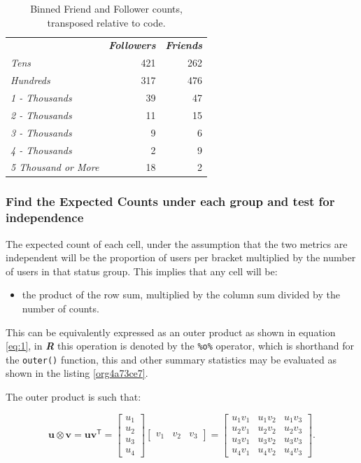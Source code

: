 \documentclass[11pt]{article}
\begin{document}
\begin{table}[htbp]
\caption{\label{tab:orgd6ff7eb}Binned Friend and Follower counts, transposed relative to code.}
\centering
\begin{tabular}{lrr}
 & \textbf{\textbf{\emph{Followers}}} & \textbf{\textbf{\emph{Friends}}}\\
\emph{Tens} & 421 & 262\\
\emph{Hundreds} & 317 & 476\\
\emph{1 - Thousands} & 39 & 47\\
\emph{2 - Thousands} & 11 & 15\\
\emph{3 - Thousands} & 9 & 6\\
\emph{4 - Thousands} & 2 & 9\\
\emph{5 Thousand or More} & 18 & 2\\
\end{tabular}
\end{table}

\subsubsection{Find the Expected Counts under each group and test for independence}
\label{sec:org65bb277}
The expected count of each cell, under the assumption that the two metrics are
independent will be the proportion of users per bracket multiplied by the number
of users in that status group. This implies that any cell will be:

\begin{itemize}
\item the product of the row sum, multiplied by the column sum divided by the number of counts.
\end{itemize}

This can be equivalently expressed as an outer product as shown in equation
\eqref{eq:1}, in \textbf{\emph{R}} this operation is denoted by the \texttt{\%o\%} operator, which is
shorthand for the \texttt{outer()} function, this and other summary statistics may be
evaluated as shown in the listing \ref{org4a73ce7}.

The outer product is such that:


$$
\mathbf{u} \otimes \mathbf {v} =\mathbf {u} \mathbf {v} ^{\textsf {T}}={\begin{bmatrix}u_{1}\\u_{2}\\u_{3}\\u_{4}\end{bmatrix}}{\begin{bmatrix}v_{1}&v_{2}&v_{3}\end{bmatrix}}={\begin{bmatrix}u_{1}v_{1}&u_{1}v_{2}&u_{1}v_{3}\\u_{2}v_{1}&u_{2}v_{2}&u_{2}v_{3}\\u_{3}v_{1}&u_{3}v_{2}&u_{3}v_{3}\\u_{4}v_{1}&u_{4}v_{2}&u_{4}v_{3}\end{bmatrix}}.
$$
\end{document}
